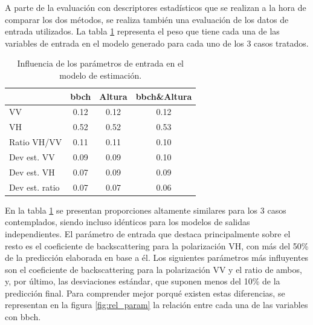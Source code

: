 \par A parte de la evaluación con descriptores estadísticos que se realizan a la hora de comparar los dos métodos, se realiza también una evaluación de los datos de entrada utilizados. La tabla \ref{tab:imp_f} representa el peso que tiene cada una de las variables de entrada en el modelo generado para cada uno de los 3 casos tratados. 

\begin{table}[h] 
\centering
\begin{tabular}{l|ccc}
               & \gls{bbch} & Altura & \gls{bbch}\&Altura \\ \hline \hline
VV             & 0.12 & 0.12   & 0.12         \\
VH             & 0.52 & 0.52   & 0.53         \\
Ratio VH/VV    & 0.11 & 0.11   & 0.10         \\
Dev est. VV    & 0.09 & 0.09   & 0.10         \\
Dev est. VH    & 0.07 & 0.09   & 0.09         \\
Dev est. ratio & 0.07 & 0.07   & 0.06        
\end{tabular}
\caption{Influencia de los parámetros de entrada en el modelo de estimación.\label{tab:imp_f}}
\end{table}

\par En la tabla \ref{tab:imp_f} se presentan proporciones altamente similares para los 3 casos contemplados, siendo incluso idénticos para los modelos de salidas independientes. El parámetro de entrada que destaca principalmente sobre el resto es el coeficiente de backscattering para la polarización VH, con más del 50\% de la predicción elaborada en base a él. Los siguientes parámetros más influyentes son el coeficiente de backscattering para la polarización VV y el ratio de ambos, y, por último, las desviaciones estándar, que suponen menos del 10\% de la predicción final. Para comprender mejor porqué existen estas diferencias, se representan en la figura \ref{fig:rel_param} la relación entre cada una de las variables con \gls{bbch}.
\\

